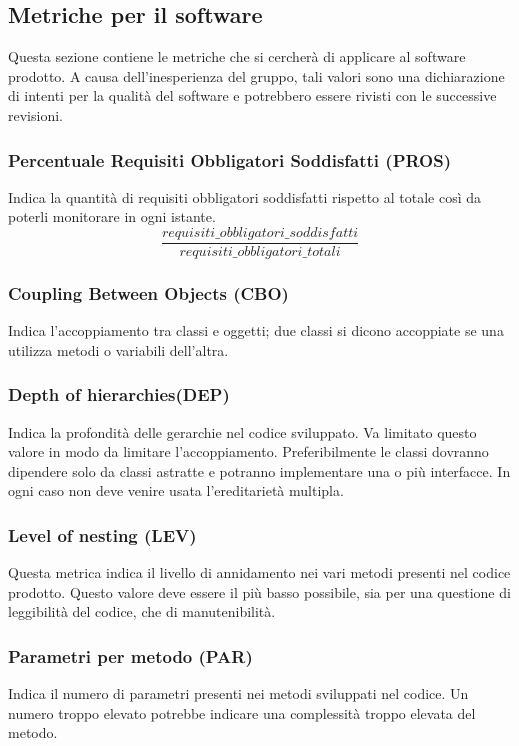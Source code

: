 \subsection{Metriche per il software}
Questa sezione contiene le metriche che si cercherà di applicare al software prodotto. A causa dell’inesperienza del gruppo, tali valori sono una dichiarazione di intenti per la qualità del software e potrebbero essere rivisti con le successive revisioni.

\subsubsection{Percentuale Requisiti Obbligatori Soddisfatti (PROS)}
Indica la quantità di requisiti obbligatori soddisfatti rispetto al totale così da poterli monitorare in ogni istante.
\[\frac{requisiti\_obbligatori\_soddisfatti}{requisiti\_obbligatori\_totali}\]

\subsubsection{Coupling Between Objects (CBO)}
Indica l'accoppiamento tra classi e oggetti; due classi si dicono accoppiate se una utilizza metodi o variabili dell'altra.

\subsubsection{Depth of hierarchies(DEP)}
Indica la profondità delle gerarchie nel codice sviluppato. Va limitato questo valore in modo da limitare l'accoppiamento. Preferibilmente le classi dovranno dipendere solo da classi astratte e potranno implementare una o più interfacce. In ogni caso non deve venire usata l'ereditarietà multipla.

\subsubsection{Level of nesting (LEV)}
Questa metrica indica il livello di annidamento nei vari metodi presenti nel codice prodotto. Questo valore deve essere il più basso possibile, sia per una questione di leggibilità del codice, che di manutenibilità.


\subsubsection{Parametri per metodo (PAR)}
Indica il numero di parametri presenti nei metodi sviluppati nel codice. Un numero troppo elevato potrebbe indicare una complessità troppo elevata del metodo.

